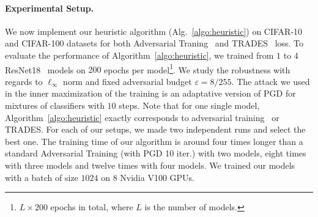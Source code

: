  

\paragraph{Experimental Setup.} We now implement our heuristic algorithm (Alg.~\ref{algo:heuristic}) on CIFAR-10 and CIFAR-100 datasets for both Adversarial Traning~\citep{madry2018towards} and TRADES~\citep{zhang2019theoretically} loss. To evaluate the performance of Algorithm~\ref{algo:heuristic}, we trained from $1$ to $4$ ResNet18~\citep{he2016deep} models on $200$ epochs per model\footnote{$L\times200$ epochs in total, where $L$ is the number of models.}. We study the robustness with regards to $\ell_\infty$ norm and fixed adversarial budget $\varepsilon=8/255$. The attack we used in the inner maximization of the training is an adaptative version of PGD for mixtures of classifiers with $10$ steps. Note that for one single model, Algorithm~\ref{algo:heuristic} exactly corresponds to adversarial training~\citep{madry2018towards} or TRADES. For each of our setups, we made two independent runs and select the  best one. The training time of our algorithm is around four times longer than a standard Adversarial Training (with PGD 10 iter.) with two models, eight times with three models and twelve times with four models. We trained our models with a batch of size  $1024$ on $8$ Nvidia V100 GPUs. 

